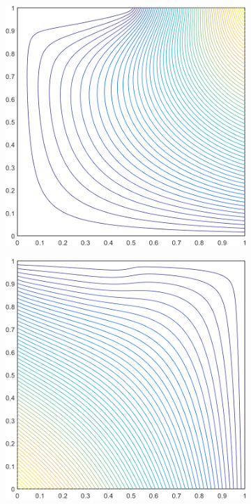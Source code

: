 \begin{figure}
\begin{subfigure}[b]{0.39\textwidth}
		\caption{}
	\end{subfigure}
	\hspace{1.5cm}
	\begin{subfigure}[b]{0.39\textwidth}
		\centering
		\includegraphics[width=\textwidth]{figures/sec_BF/deg_square_MAXENT1_contour_b3.png}
		\caption{}
	\end{subfigure}
	\vfill
	\begin{subfigure}[b]{0.39\textwidth}
		\centering
		\includegraphics[width=\textwidth]{figures/sec_BF/deg_square_MAXENT1_contour_b1.png}

\end{subfigure}
\end{figure}
